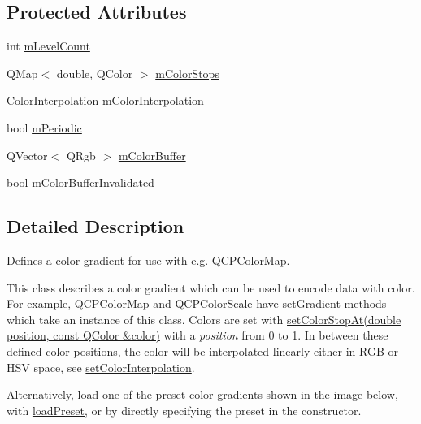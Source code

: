 \subsection*{Protected Attributes}
\begin{DoxyCompactItemize}
\item 
int \hyperlink{class_q_c_p_color_gradient_a98fb68e359904b2c991fcae3e38a211a}{m\+Level\+Count}
\item 
Q\+Map$<$ double, Q\+Color $>$ \hyperlink{class_q_c_p_color_gradient_a9e11a2b0974ef289d12c324822bc3a3e}{m\+Color\+Stops}
\item 
\hyperlink{class_q_c_p_color_gradient_ac5dca17cc24336e6ca176610e7f77fc1}{Color\+Interpolation} \hyperlink{class_q_c_p_color_gradient_a028cef73d863800a9ee93ffd641cce01}{m\+Color\+Interpolation}
\item 
bool \hyperlink{class_q_c_p_color_gradient_a4b07deeb20ca1ee2d5ea7e01bf0420af}{m\+Periodic}
\item 
Q\+Vector$<$ Q\+Rgb $>$ \hyperlink{class_q_c_p_color_gradient_af8b5f0739faa5f8295154d47ce38ecff}{m\+Color\+Buffer}
\item 
bool \hyperlink{class_q_c_p_color_gradient_abacf55e11f67d6722a687af1bb2687bd}{m\+Color\+Buffer\+Invalidated}
\end{DoxyCompactItemize}


\subsection{Detailed Description}
Defines a color gradient for use with e.\+g. \hyperlink{class_q_c_p_color_map}{Q\+C\+P\+Color\+Map}. 

This class describes a color gradient which can be used to encode data with color. For example, \hyperlink{class_q_c_p_color_map}{Q\+C\+P\+Color\+Map} and \hyperlink{class_q_c_p_color_scale}{Q\+C\+P\+Color\+Scale} have \hyperlink{class_q_c_p_color_map_a7313c78360471cead3576341a2c50377}{set\+Gradient} methods which take an instance of this class. Colors are set with \hyperlink{class_q_c_p_color_gradient_a3b48be5e78079db1bb2a1188a4c3390e}{set\+Color\+Stop\+At(double position, const Q\+Color \&color)} with a {\itshape position} from 0 to 1. In between these defined color positions, the color will be interpolated linearly either in R\+GB or H\+SV space, see \hyperlink{class_q_c_p_color_gradient_aa13fda86406e1d896a465a409ae63b38}{set\+Color\+Interpolation}.

Alternatively, load one of the preset color gradients shown in the image below, with \hyperlink{class_q_c_p_color_gradient_aa0aeec1528241728b9671bf8e60b1622}{load\+Preset}, or by directly specifying the preset in the constructor.

